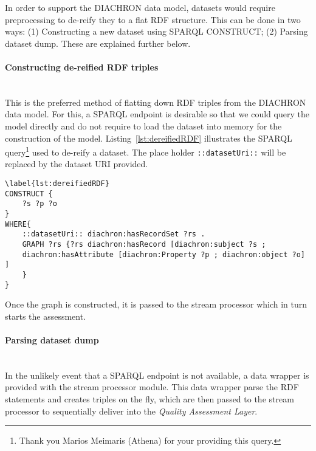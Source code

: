 In order to support the DIACHRON data model, datasets would require preprocessing to de-reify they to a flat RDF structure.
This can be done in two ways: (1) Constructing a new dataset using SPARQL CONSTRUCT; (2) Parsing dataset dump.
These are explained further below.

\paragraph{Constructing de-reified RDF triples}~\\
This is the preferred method of flatting down RDF triples from the DIACHRON data model.
For this, a SPARQL endpoint is desirable so that we could query the model directly and do not require to load the dataset into memory for the construction of the model.
Listing~\ref{lst:dereifiedRDF} illustrates the SPARQL query\footnote{Thank you Marios Meimaris (Athena) for your providing this query.} used to de-reify a dataset.
The place holder \texttt{::datasetUri::} will be replaced by the dataset URI provided.
\begin{lstlisting}[language=N3]
\label{lst:dereifiedRDF}
CONSTRUCT {
	?s ?p ?o
}
WHERE{
	::datasetUri:: diachron:hasRecordSet ?rs .
	GRAPH ?rs {?rs diachron:hasRecord [diachron:subject ?s ;
	diachron:hasAttribute [diachron:Property ?p ; diachron:object ?o] ]
	}
}
\end{lstlisting}
Once the graph is constructed, it is passed to the stream processor which in turn starts the assessment.

\paragraph{Parsing dataset dump}~\\
In the unlikely event that a SPARQL endpoint is not available, a data wrapper is provided with the stream processor module.
This data wrapper parse the RDF statements and creates triples on the fly, which are then passed to the stream processor to sequentially deliver into the \emph{Quality Assessment Layer}.